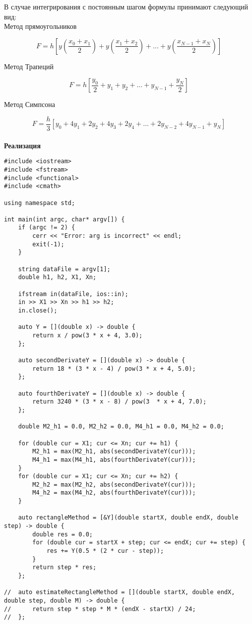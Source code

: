 В случае интегрирования с постоянным шагом формулы принимают следующий вид:\\

Метод прямоугольников

$$
F=h[y(\frac{x_0+x_1}{2})+y(\frac{x_1+x_2}{2})+...+y(\frac{x_{N-1}+x_N}{2})]
$$

Метод Трапеций

$$
F=h[\frac{y_0}{2}+y_1+y_2+...+y_{N-1}+\frac{y_N}{2}]
$$

Метод Симпсона

$$
F=\frac{h}{3}[y_0+4y_1+2y_2+4y_3+2y_4+...+2y_{N-2}+4y_{N-1}+y_N]
$$\\

\textbf{Реализация}
\begin{lstlisting}
#include <iostream>
#include <fstream>
#include <functional>
#include <cmath>

using namespace std;

int main(int argc, char* argv[]) {
	if (argc != 2) {
		cerr << "Error: arg is incorrect" << endl;
		exit(-1);
	}

	string dataFile = argv[1];
	double h1, h2, X1, Xn;
	
	ifstream in(dataFile, ios::in);
	in >> X1 >> Xn >> h1 >> h2;
	in.close();

	auto Y = [](double x) -> double {
		return x / pow(3 * x + 4, 3.0);
	};

	auto secondDerivateY = [](double x) -> double {
		return 18 * (3 * x - 4) / pow(3 * x + 4, 5.0);
	};

	auto fourthDerivateY = [](double x) -> double {
		return 3240 * (3 * x - 8) / pow(3  * x + 4, 7.0);
	};

	double M2_h1 = 0.0, M2_h2 = 0.0, M4_h1 = 0.0, M4_h2 = 0.0;

	for (double cur = X1; cur <= Xn; cur += h1) {
		M2_h1 = max(M2_h1, abs(secondDerivateY(cur)));
		M4_h1 = max(M4_h1, abs(fourthDerivateY(cur)));
	}
	for (double cur = X1; cur <= Xn; cur += h2) {
		M2_h2 = max(M2_h2, abs(secondDerivateY(cur)));
		M4_h2 = max(M4_h2, abs(fourthDerivateY(cur)));		
	}

	auto rectangleMethod = [&Y](double startX, double endX, double step) -> double {		
		double res = 0.0;
		for (double cur = startX + step; cur <= endX; cur += step) {
			res += Y(0.5 * (2 * cur - step));
		}
		return step * res;
	};

//	auto estimateRectangleMethod = [](double startX, double endX, double step, double M) -> double {
//		return step * step * M * (endX - startX) / 24;
//	};


\end{lstlisting}
